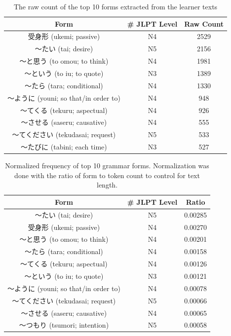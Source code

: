 \begin{table}[h!]
\centering
\begin{tabular}{ccc}
\hline \textbf{Form} & \textbf{\# JLPT Level} & \textbf{Raw Count} \\ \hline
受身形 (ukemi; passive)                & N4 & 2529 \\
〜たい (tai; desire)                  & N5 & 2156 \\
〜と思う (to omou; to think)          & N4 & 1981 \\
〜という (to iu; to quote)            & N3 & 1389 \\
〜たら (tara; conditional)            & N4 & 1330 \\
〜ように (youni; so that/in order to) & N4 & 948 \\
〜てくる (tekuru; aspectual)          & N4 & 926 \\
〜させる (saseru; causative)          & N4 & 555 \\
〜てください (tekudasai; request)     & N5 & 533 \\
〜たびに (tabini; each time)          & N3 & 527 \\
\hline
\end{tabular}
\caption[Raw frequency of Top 10 Forms extracted from the I-JAS Corpus]{The raw count of the top 10 forms extracted
from the learner texts}
\label{tab:CF-form-freq}
\end{table}

\begin{table}[h!]
\centering
\begin{tabular}{ccc}
\hline \textbf{Form} & \textbf{\# JLPT Level} & \textbf{Ratio} \\ \hline
〜たい (tai; desire)                      & N5 & 0.00285 \\
受身形 (ukemi; passive)                  & N4 & 0.00270 \\
〜と思う (to omou; to think)             & N4 & 0.00201 \\
〜たら (tara; conditional)               & N4 & 0.00158 \\
〜てくる (tekuru; aspectual)             & N4 & 0.00126 \\
〜という (to iu; to quote)               & N3 & 0.00121 \\
〜ように (youni; so that/in order to)    & N4 & 0.00078 \\
〜てください (tekudasai; request)        & N5 & 0.00066 \\
〜させる (saseru; causative)             & N4 & 0.00065 \\
〜つもり (tsumori; intention)            & N5 & 0.00058 \\
\hline
\end{tabular}
\caption[Top 10 Grammar forms by normalized token ratio extracted from the I-JAS Corpus]{Normalized frequency of top
10 grammar forms. Normalization was done with the ratio of form to token count to control for text length. }
\label{tab:CF-form-freq-ratio}
\end{table}

